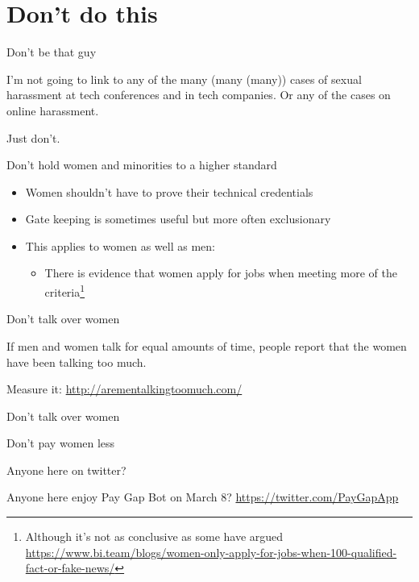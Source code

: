 \documentclass[xcolor=table,aspectratio=169]{beamer}
\begin{document}
\section{Don't do this}

\begin{frame}{Don't be that guy}

	I'm not going to link to any of the many (many (many)) cases of sexual harassment at tech conferences and in tech companies. Or any of the cases on online harassment.

	\vspace{0.5em}

	Just don't.

\end{frame}

\begin{frame}{Don't hold women and minorities to a higher standard}
	\begin{itemize}
	\item Women shouldn't have to prove their technical credentials
	\item Gate keeping is sometimes useful but more often exclusionary
	\item This applies to women as well as men:
	\begin{itemize}
\item There is evidence that women apply for jobs when meeting more of the criteria\footnote{Although it's not as conclusive as some have argued \url{https://www.bi.team/blogs/women-only-apply-for-jobs-when-100-qualified-fact-or-fake-news/}}
	\end{itemize}
	\end{itemize}
\end{frame}
\begin{frame}{Don't talk over women}

	If men and women talk for equal amounts of time, people report that the women have been talking too much. 

	\vspace{0.5em}

	Measure it: \url{http://arementalkingtoomuch.com/}


	\vspace{0.5em}


	Don't talk over women

\end{frame}
\begin{frame}{Don't pay women less}

	Anyone here on twitter?

	\vspace{0.5em}

	Anyone here enjoy Pay Gap Bot on March 8? \url{https://twitter.com/PayGapApp}
\end{frame}
\end{document}
